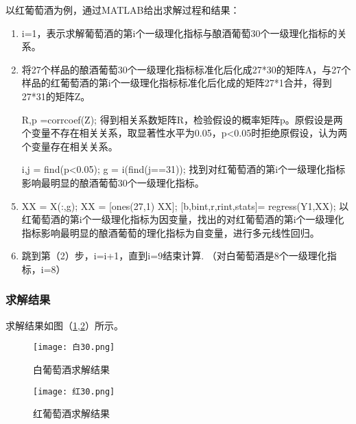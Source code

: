 \documentclass[withoutpreface,bwprint]{cumcmthesis} %
\begin{document}
以红葡萄酒为例，通过MATLAB给出求解过程和结果：
\begin{enumerate}
	\item i=1，表示求解葡萄酒的第i个一级理化指标与酿酒葡萄30个一级理化指标的关系。
	\item 将27个样品的酿酒葡萄30个一级理化指标标准化后化成27*30的矩阵A，与27个样品的红葡萄酒的第i个一级理化指标标准化后化成的矩阵27*1合并，得到27*31的矩阵Z。
	\item [R,p]=corrcoef(Z); 得到相关系数矩阵R，检验假设的概率矩阵p。原假设是两个变量不存在相关关系，取显著性水平为0.05，p<0.05时拒绝原假设，认为两个变量存在相关关系。
	\item [i,j] = find(p<0.05);  g = i(find(j==31)); 找到对红葡萄酒的第i个一级理化指标影响最明显的酿酒葡萄30个一级理化指标。
	\item  XX = X(:,g); XX = [ones(27,1) XX]; [b,bint,r,rint,stats]= regress(Y1,XX); 以红葡萄酒的第i个一级理化指标为因变量，找出的对红葡萄酒的第i个一级理化指标影响最明显的酿酒葡萄的理化指标为自变量，进行多元线性回归。 
	\item 跳到第（2）步，i=i+1，直到i=9结束计算. （对白葡萄酒是8个一级理化指标，i=8） 
\end{enumerate}

\subsubsection{求解结果}
求解结果如图（\ref{白葡萄酒求解结果},\ref{红葡萄酒求解结果}）所示。
\begin{figure}[!h]
\centering
\texttt{[image: 白30.png]}
\caption{白葡萄酒求解结果}
\label{白葡萄酒求解结果}
\end{figure}

\begin{figure}[!h]
\centering
\texttt{[image: 红30.png]}
\caption{红葡萄酒求解结果}
\label{红葡萄酒求解结果}
\end{figure}
\end{document}
